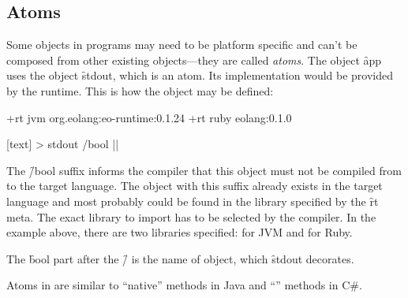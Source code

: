 \subsection{Atoms}

Some objects in \eo{} programs may need to be platform specific
and can't be composed from other existing objects---they are called
\emph{atoms}.
The object \f{app} uses the object \f{stdout},
which is an atom. Its implementation would be provided by the
runtime. This is how the object may be defined:

\begin{eocode}
+rt jvm org.eolang:eo-runtime:0.1.24
+rt ruby eolang:0.1.0

[text] > stdout /bool |$\label{ln:stdout}$|
\end{eocode}

The \f{/bool} suffix informs the compiler that this object must
not be compiled from \eo{} to the target language. The object
with this suffix already exists in the target language and most
probably could be found in the library specified by the \f{rt}
meta. The exact library to import has to be selected by the compiler.
In the example above, there are two libraries specified: for JVM and
for Ruby.

The \f{bool} part after the \f{/} is the name of
object, which \f{stdout} decorates.

Atoms in \eo{} are similar to ``native'' methods in Java and ``'' methods
in C\#.







